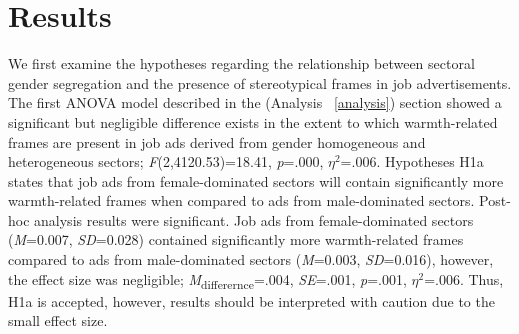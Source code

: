 \documentclass[jou]{apa7}
\begin{document}
\section{Results}
\label{results}
We first examine the hypotheses regarding the relationship between sectoral gender segregation and the presence of stereotypical frames in job advertisements. The first ANOVA model described in the (Analysis ~\ref{analysis}) section showed a significant but negligible difference exists in the extent to which warmth-related frames are present in job ads derived from gender homogeneous and heterogeneous sectors; \textit{F}(2,4120.53)=18.41, \textit{p}=.000, \textit{$\eta^2$}=.006. Hypotheses H1a states that job ads from female-dominated sectors will contain significantly more warmth-related frames when compared to ads from male-dominated sectors. Post-hoc analysis results were significant. Job ads from female-dominated sectors (\textit{M}=0.007, \textit{SD}=0.028) contained significantly more warmth-related frames compared to ads from male-dominated sectors (\textit{M}=0.003, \textit{SD}=0.016), however, the effect size was negligible; \textit{M}\textsubscript{differernce}=.004, \textit{SE}=.001, \textit{p}=.001, \textit{$\eta^2$}=.006. Thus, H1a is accepted, however, results should be interpreted with caution due to the small effect size.
\end{document}
